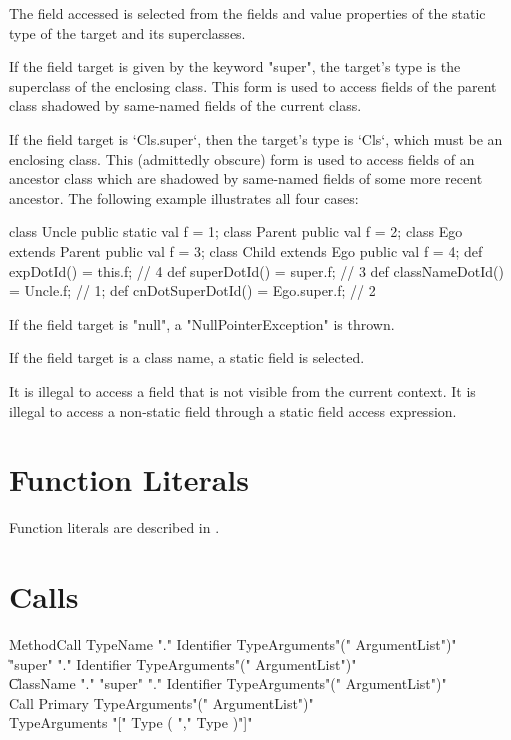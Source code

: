 The field accessed is selected from the fields and value properties
of the static type of the target and its superclasses.

If the field target is given by the keyword \xcd"super", the target's type is
the superclass of the enclosing class.  This form is used to access fields of
the parent class shadowed by same-named fields of the current class.

If the field target is \xcd`Cls.super`, then the target's type is \xcd`Cls`,
which must be an  enclosing class.  This (admittedly
obscure) form is used to access fields of an ancestor class which are shadowed
by same-named fields of some more recent ancestor.  The following example
illustrates all four cases:

\begin{xten}
class Uncle {
  public static val f = 1;
}
class Parent {
  public val f = 2;
}
class Ego extends Parent {
  public val f = 3;
  class Child extends Ego {
     public val f = 4;
     def expDotId() = this.f; // 4
     def superDotId() = super.f; // 3
     def classNameDotId() = Uncle.f; // 1;
     def cnDotSuperDotId() = Ego.super.f; // 2
  }
}
\end{xten}
%


If the field target is \xcd"null", a \xcd"NullPointerException"
is thrown.

If the field target is a class name, a static field is selected.

It is illegal to access  a field that is not visible from
the current context.
It is illegal to access a non-static field
through a static field access expression.

\section{Function Literals}
Function literals are described in .

\section{Calls}
\label{Call}
\label{MethodInvocation}
\label{MethodInvocationSubstitution}

\begin{grammar}
MethodCall \: TypeName \xcd"." Identifier TypeArguments\opt \xcd"(" ArgumentList\opt \xcd")" \\
           \| \xcd"super" \xcd"." Identifier TypeArguments\opt \xcd"(" ArgumentList\opt \xcd")" \\
           \| ClassName \xcd"." \xcd"super" \xcd"." Identifier TypeArguments\opt \xcd"(" ArgumentList\opt \xcd")" \\
Call \: Primary TypeArguments\opt \xcd"(" ArgumentList\opt \xcd")" \\
TypeArguments \: \xcd"[" Type ( \xcd"," Type )\star \xcd"]" \\
\end{grammar}

